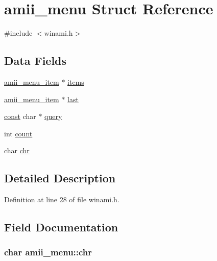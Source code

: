 \hypertarget{structamii__menu}{\section{amii\+\_\+menu Struct Reference}
\label{structamii__menu}
}


{\ttfamily \#include $<$winami.\+h$>$}

\subsection*{Data Fields}
\begin{DoxyCompactItemize}
\item 
\hyperlink{winami_8h_aece08fc25183baf9557e21ef1adc4c2c}{amii\+\_\+menu\+\_\+item} $\ast$ \hyperlink{structamii__menu_a01d8d53511bbcb518c8c721c42a1168d}{items}
\item 
\hyperlink{winami_8h_aece08fc25183baf9557e21ef1adc4c2c}{amii\+\_\+menu\+\_\+item} $\ast$ \hyperlink{structamii__menu_a9bcaeffce2bc3c2bfbac65309e3f80ce}{last}
\item 
\hyperlink{tradstdc_8h_a2c212835823e3c54a8ab6d95c652660e}{const} char $\ast$ \hyperlink{structamii__menu_a775d836d091d25502cd864c8ff76a2bd}{query}
\item 
int \hyperlink{structamii__menu_a6498bbd7c8a254b78e3cf333f3ce3318}{count}
\item 
char \hyperlink{structamii__menu_a8a21d4745ccbca398561a27079e4e5f8}{chr}
\end{DoxyCompactItemize}


\subsection{Detailed Description}


Definition at line 28 of file winami.\+h.



\subsection{Field Documentation}
\hypertarget{structamii__menu_a8a21d4745ccbca398561a27079e4e5f8}{
\subsubsection[{chr}]{\setlength{\rightskip}{0pt plus 5cm}char amii\+\_\+menu\+::chr}}\label{structamii__menu_a8a21d4745ccbca398561a27079e4e5f8}


